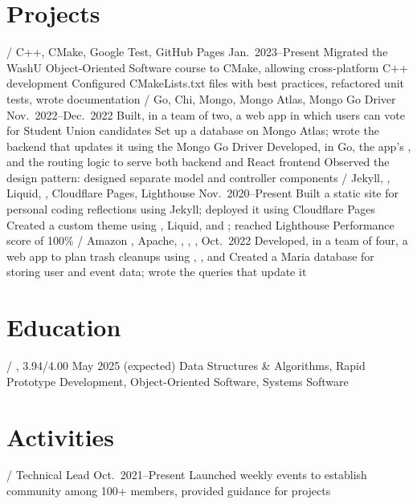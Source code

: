 \section{Projects}
\begin{outline}
     / C++, CMake, Google Test, GitHub Pages
    \hfill Jan.\ 2023--Present
        \1 Migrated the WashU Object-Oriented Software course to CMake, allowing cross-platform C++ development
            \2 Configured CMakeLists.txt files with best practices, refactored unit tests, wrote documentation
     / Go, Chi, Mongo, Mongo Atlas, Mongo Go Driver
    \hfill Nov.\ 2022--Dec.\ 2022
        \1 Built, in a team of two, a web app in which users can vote for Student Union candidates
            \2 Set up a database on Mongo Atlas; wrote the backend that updates it using the Mongo Go Driver
            \2 Developed, in Go, the app's  , and the routing logic to serve both backend and React frontend
            \2 Observed the  design pattern: designed separate model and controller components
     / Jekyll, , Liquid, , Cloudflare Pages, Lighthouse
    \hfill Nov.\ 2020--Present
        \1 Built a static site for personal coding reflections using Jekyll; deployed it using Cloudflare Pages
            \2 Created a custom theme using , Liquid, and ; reached Lighthouse Performance score of 100\%
     / Amazon , Apache, , , , 
    \hfill Oct.\ 2022
        \1 Developed, in a team of four, a web app to plan trash cleanups using , , and 
            \2 Created a Maria database for storing user and event data; wrote the  queries that update it
\end{outline}

\section{Education}
\begin{outline}
     / ,  3.94/4.00
    \hfill May 2025 (expected)
        \1 Data Structures \& Algorithms, Rapid Prototype Development, Object-Oriented Software, Systems Software
\end{outline}

\section{Activities}
\begin{outline}
     / Technical Lead
    \hfill Oct.\ 2021--Present
        \1 Launched weekly events to establish community among 100+ members, provided guidance for  projects
\end{outline}
